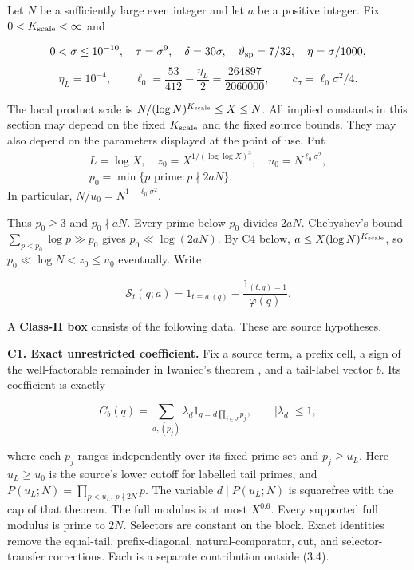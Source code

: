 Let $N$ be a sufficiently large even integer and let $a$ be a positive
integer. Fix $0<K_{\rm scale}<\infty$ and

\[
0<\sigma\le10^{-10},\quad \tau=\sigma^9,\quad\delta=30\sigma,
\quad\vartheta_{\rm sp}=7/32,\quad\eta=\sigma/1000,
\]
\[
\eta_L=10^{-4},\qquad
\ell_0=\frac{53}{412}-\frac{\eta_L}{2}
       =\frac{264897}{2060000},\qquad
c_\sigma=\ell_0\sigma^2/4.
\tag{3.1}
\]

The local product scale is
$N/(\log N)^{K_{\rm scale}}\le X\le N$.
All implied constants in this section may depend on the fixed
$K_{\rm scale}$ and the fixed source bounds. They may also depend on
the parameters displayed at the point of use. Put
\[
\begin{gathered}
L=\log X,\quad z_0=X^{1/(\log\log X)^3},\quad
u_0=N^{\ell_0\sigma^2},\\
p_0=\min\{p\text{ prime}:p\nmid 2aN\}.
\end{gathered}
\tag{3.2}
\]
In particular, $N/u_0=N^{1-\ell_0\sigma^2}$.

Thus $p_0\ge3$ and $p_0\nmid aN$.
Every prime below $p_0$ divides $2aN$.
Chebyshev's bound $\sum_{p<p_0}\log p\gg p_0$ gives
$p_0\ll\log(2aN)$. By C4 below, $a\le X(\log N)^{K_{\rm scale}}$,
so $p_0\ll\log N<z_0\le u_0$ eventually. Write

\[
\mathcal S_t(q;a)=1_{t\equiv a\ (q)}-
                    \frac{1_{(t,q)=1}}{\varphi(q)}.
\tag{3.3}
\]

A \textbf{Class-II box} consists of the following data.
These are source hypotheses.

\textbf{C1. Exact unrestricted coefficient.} Fix a source term, a prefix cell,
a sign of the well-factorable remainder in Iwaniec's theorem \cite[Theorem~4]{AA37},
and a tail-label vector $b$. Its coefficient is exactly

\[
C_b(q)=\sum_{d,(p_j)}\lambda_d
                  1_{q=d\prod_{j\in J}p_j},\qquad |\lambda_d|\le1,
\tag{3.4}
\]

where each $p_j$ ranges independently over its fixed prime set and
$p_j\ge u_L$.
Here $u_L\ge u_0$ is the source's lower cutoff for labelled tail primes,
and $P(u_L;N)=\prod_{p<u_L,\,p\nmid2N}p$.
The variable $d\mid P(u_L;N)$ is squarefree with the
cap of that theorem. The full modulus is at most $X^{0.6}$.
Every supported full modulus is prime to $2N$.
Selectors are constant on the block.
Exact identities remove the equal-tail, prefix-diagonal, natural-comparator,
cut, and selector-transfer corrections.
Each is a separate contribution outside (3.4).

